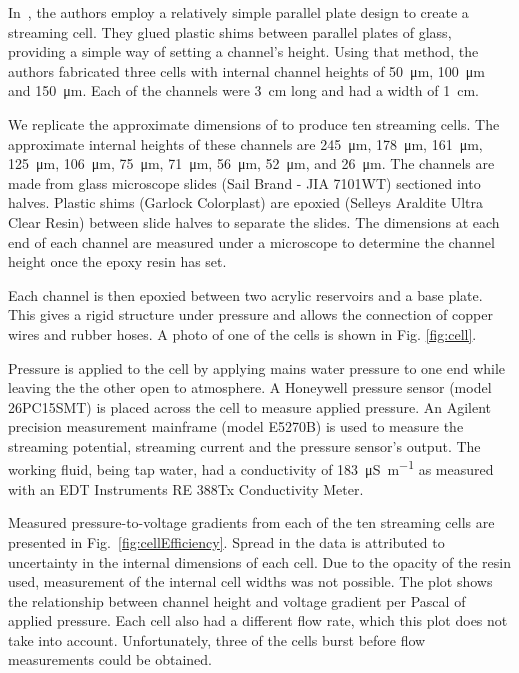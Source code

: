 \documentclass[10pt,final,journal]{IEEEtran}
\begin{document}
    In~\cite{Gu2000}, the authors employ a relatively simple parallel plate design to create a streaming cell.
    They glued plastic shims between parallel plates of glass, providing a simple way of setting a channel's height.
    Using that method, the authors fabricated three cells with internal channel heights of \SI{50}{\micro\metre}, \SI{100}{\micro\metre} and \SI{150}{\micro\metre}.
    Each of the channels were \SI{3}{\centi\metre} long and had a width of \SI{1}{\centi\metre}.

    We replicate the approximate dimensions of \cite{Gu2000} to produce ten streaming cells.
    The approximate internal heights of these channels are \SI{245}{\micro\metre}, \SI{178}{\micro\metre}, \SI{161}{\micro\metre}, \SI{125}{\micro\metre}, \SI{106}{\micro\metre}, \SI{75}{\micro\metre}, \SI{71}{\micro\metre}, \SI{56}{\micro\metre}, \SI{52}{\micro\metre}, and \SI{26}{\micro\metre}.
    The channels are made from glass microscope slides (Sail Brand - JIA 7101WT) sectioned into halves.
    Plastic shims (Garlock Colorplast) are epoxied (Selleys Araldite Ultra Clear Resin) between slide halves to separate the slides.
    The dimensions at each end of each channel are measured under a microscope to determine the channel height once the epoxy resin has set.

    Each channel is then epoxied between two acrylic reservoirs and a base plate.
    This gives a rigid structure under pressure and allows the connection of copper wires and rubber hoses.
    A photo of one of the cells is shown in Fig. \ref{fig:cell}.

    Pressure is applied to the cell by applying mains water pressure to one end while leaving the the other open to atmosphere.
    A Honeywell pressure sensor (model 26PC15SMT) is placed across the cell to measure applied pressure.
    An Agilent precision measurement mainframe (model E5270B) is used to measure the streaming potential, streaming current and the pressure sensor's output.
    The working fluid, being tap water, had a conductivity of \SI{183}{\micro\siemens\per\metre} as measured with an EDT Instruments RE 388Tx Conductivity Meter.

    Measured pressure-to-voltage gradients from each of the ten streaming cells are presented in Fig.~\ref{fig:cellEfficiency}.
    Spread in the data is attributed to uncertainty in the internal dimensions of each cell.
    Due to the opacity of the resin used, measurement of the internal cell widths was not possible.
    The plot shows the relationship between channel height and voltage gradient per Pascal of applied pressure.
    Each cell also had a different flow rate, which this plot does not take into account.
    Unfortunately, three of the cells burst before flow measurements could be obtained.
\end{document}
